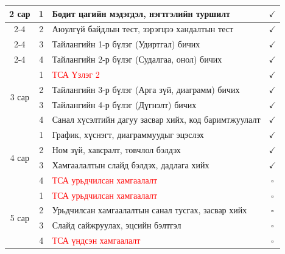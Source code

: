 \begin{table}[h!t]
\begin{tabular}{|c|c|p{7.5cm}|c|}
\multirow{4}{*}{2 сар}
& 1 & Бодит цагийн мэдэгдэл, нэгтгэлийн туршилт & $\checkmark$ \\
\cline{2-4}
& 2 & Аюулгүй байдлын тест, зэрэгцээ хандалтын тест & $\checkmark$ \\
\cline{2-4}
& 3 & Тайлангийн 1-р бүлэг (Удиртгал) бичих & $\checkmark$ \\
\cline{2-4}
& 4 & Тайлангийн 2-р бүлэг (Судалгаа, онол) бичих & $\checkmark$ \\
\hline

\multirow{4}{*}{3 сар}
& 1 & \textcolor{red}{ТСА Үзлэг 2} & $\checkmark$ \\
\cline{2-4}
& 2 & Тайлангийн 3-р бүлэг (Арга зүй, диаграмм) бичих & $\checkmark$ \\
\cline{2-4}
& 3 & Тайлангийн 4-р бүлэг (Дүгнэлт) бичих & $\checkmark$ \\
\cline{2-4}
& 4 & Санал хүсэлтийн дагуу засвар хийх, код баримтжуулалт & $\checkmark$ \\
\hline

\multirow{4}{*}{4 сар}
& 1 & График, хүснэгт, диаграммуудыг эцэслэх & $\checkmark$ \\
\cline{2-4}
& 2 & Ном зүй, хавсралт, товчлол бэлдэх & $\checkmark$ \\
\cline{2-4}
& 3 & Хамгаалалтын слайд бэлдэх, дадлага хийх & $\checkmark$ \\
\cline{2-4}
& 4 & \textcolor{red}{ТСА урьдчилсан хамгаалалт} & $\square$ \\
\hline

\multirow{4}{*}{5 сар}
& 1 & \textcolor{red}{ТСА урьдчилсан хамгаалалт} & $\square$ \\
\cline{2-4}
& 2 & Урьдчилсан хамгаалалтын санал тусгах, засвар хийх & $\square$ \\
\cline{2-4}
& 3 & Слайд сайжруулах, эцсийн бэлтгэл & $\square$ \\
\cline{2-4}
& 4 & \textcolor{red}{ТСА үндсэн хамгаалалт} & $\square$ \\
\hline

\end{tabular}
\end{table}

